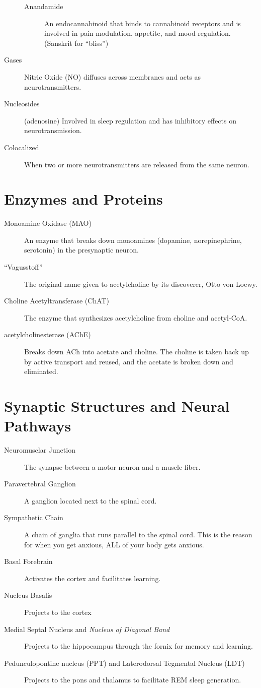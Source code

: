 \begin{description}
    \begin{description}
        \item[Anandamide] An endocannabinoid that binds to cannabinoid receptors and is involved in pain modulation, appetite, and mood regulation. (Sanskrit for ``bliss'')
    \end{description}
    \item[Gases] Nitric Oxide (NO) diffuses across membranes and acts as neurotransmitters.
    \item[Nucleosides] (adenosine) Involved in sleep regulation and has inhibitory effects on neurotransmission.
    \item[Colocalized] When two or more neurotransmitters are released from the same neuron. 
\end{description}

\section*{Enzymes and Proteins}
\begin{description}
    \item[Monoamine Oxidase (MAO)] An enzyme that breaks down monoamines (dopamine, norepinephrine, serotonin) in the presynaptic neuron.
    \item[``Vagusstoff''] The original name given to acetylcholine by its discoverer, Otto von Loewy.
    \item[Choline Acetyltransferase (ChAT)] The enzyme that synthesizes acetylcholine from choline and acetyl-CoA.
    \item[acetylcholinesterase (AChE)]  Breaks down ACh into acetate and choline. The choline is taken back up by active transport and reused, and the acetate is broken down and eliminated.
\end{description}

\section*{Synaptic Structures and Neural Pathways}
\begin{description}
    \item[Neuromusclar Junction] The synapse between a motor neuron and a muscle fiber.
    \item[Paravertebral Ganglion] A ganglion located next to the spinal cord.
    \item[Sympathetic Chain] A chain of ganglia that runs parallel to the spinal cord. This is the reason for when you get anxious, ALL of your body gets anxious.
    \item[Basal Forebrain] Activates the cortex and facilitates learning.
    \item[Nucleus Basalis] Projects to the cortex
    \item[Medial Septal Nucleus and \textit{Nucleus of Diagonal Band}]   Projects to the hippocampus through the fornix for memory and learning.
    \item[Pedunculopontine nucleus (PPT) and Laterodorsal Tegmental Nucleus (LDT)]  Projects to the pons and thalamus to facilitate REM sleep generation.
\end{description}

